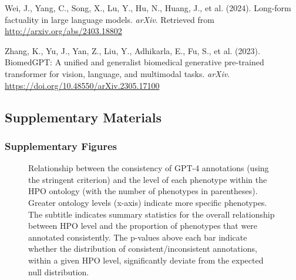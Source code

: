 \documentclass[
]{agujournal2019}
\newlength{\cslhangindent}
\newenvironment{CSLReferences}[2] %
 {\begin{list}{}{%
  \setlength{\itemindent}{0pt}
  \setlength{\leftmargin}{0pt}
  \setlength{\parsep}{0pt}
  \ifodd #1
   \setlength{\leftmargin}{\cslhangindent}
   \setlength{\itemindent}{-1\cslhangindent}
  \fi
  \setlength{\itemsep}{#2\baselineskip}}}
 {\end{list}}
\begin{document}
\begin{CSLReferences}{1}{0}
Wei, J., Yang, C., Song, X., Lu, Y., Hu, N., Huang, J., et al. (2024).
Long-form factuality in large language models. \emph{arXiv}. Retrieved
from \url{http://arxiv.org/abs/2403.18802}

Zhang, K., Yu, J., Yan, Z., Liu, Y., Adhikarla, E., Fu, S., et al.
(2023). BiomedGPT: A unified and generalist biomedical generative
pre-trained transformer for vision, language, and multimodal tasks.
\emph{arXiv}. \url{https://doi.org/10.48550/arXiv.2305.17100}

\end{CSLReferences}

\newpage{}

\subsection{Supplementary Materials}\label{supplementary-materials}

\subsubsection{Supplementary Figures}\label{supplementary-figures}

\label{cell-fig-consist-vs-ontLvl}
\begin{figure}[H]


\caption{\label{fig-consist-vs-ontLvl}Relationship between the
consistency of GPT-4 annotations (using the stringent criterion) and the
level of each phenotype within the HPO ontology (with the number of
phenotypes in parentheses). Greater ontology levels (x-axis) indicate
more specific phenotypes. The subtitle indicates summary statistics for
the overall relationship between HPO level and the proportion of
phenotypes that were annotated consistently. The p-values above each bar
indicate whether the distribution of consistent/inconsistent
annotations, within a given HPO level, significantly deviate from the
expected null distribution.}

\end{figure}%
\end{document}
